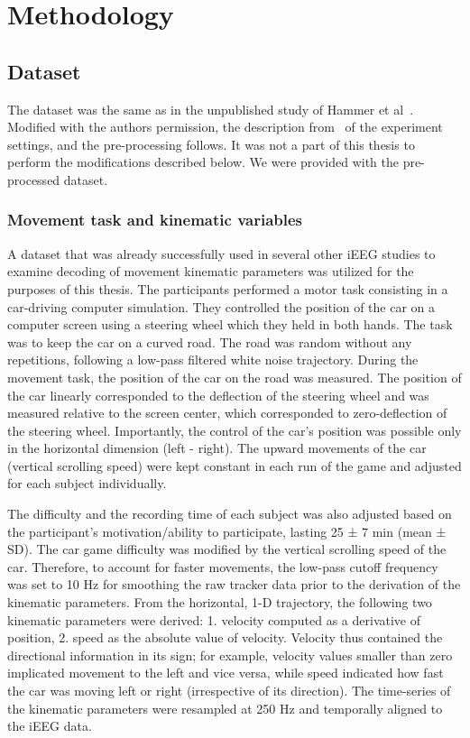 \chapter{Methodology}

\section{Dataset}
The dataset was the same as in the unpublished study of Hammer et al~\cite{Hammer-2021}.
Modified with the authors permission, the description from~\cite{hammer-predominance-2016} of the experiment settings,
and the pre-processing follows.
It was not a part of this thesis to perform the modifications described below.
We were provided with the pre-processed dataset.

\subsection{Movement task and kinematic variables}\label{subsec:movement-task-and-kinematic-variables}
A dataset that was already successfully used in several other iEEG studies to examine decoding of movement kinematic parameters \cite{Hammer-2021}\cite{hammer-predominance-2016}\cite{hammer-role-2013} was utilized for the purposes of this thesis.
The participants performed a motor task consisting in a car-driving computer simulation.
They controlled the position of the car on a computer screen using a steering wheel which they held in both hands.
The task was to keep the car on a curved road.
The road was random without any repetitions, following a low-pass filtered white noise trajectory.
During the movement task, the position of the car on the road was measured.
The position of the car linearly corresponded to the deflection of the steering wheel and was measured relative to the screen center, which corresponded to zero-deflection of the steering wheel.
Importantly, the control of the car's position was possible only in the horizontal dimension (left - right).
The upward movements of the car (vertical scrolling speed) were kept constant in each run of the game and adjusted for each subject individually.

The difficulty and the recording time of each subject was also adjusted based on the participant's motivation/ability to participate, lasting 25 ± 7 min (mean ± SD).
The car game difficulty was modified by the vertical scrolling speed of the car.
Therefore, to account for faster movements, the low-pass cutoff frequency was set to 10 Hz for smoothing the raw tracker data prior to the derivation of the kinematic parameters.
From the horizontal, 1-D trajectory, the following two kinematic parameters were derived:
1. velocity computed as a derivative of position, 2. speed as the absolute value of velocity.
Velocity thus contained the directional information in its sign;
for example, velocity values smaller than zero implicated movement to the left and vice versa, while speed indicated how fast the car was moving left or right (irrespective of its direction).
The time-series of the kinematic parameters were resampled at 250 Hz and temporally aligned to the iEEG data.


